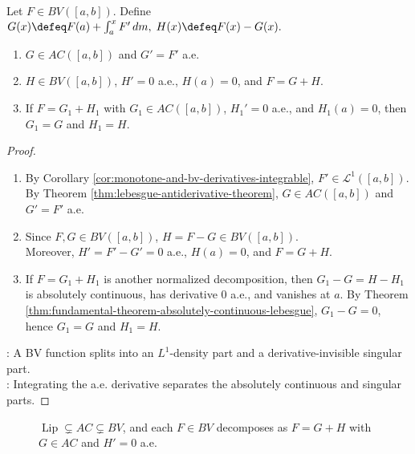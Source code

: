 \begin{theorem} \label{thm:lebesgue-decomposition-bv-functions} \\
Let $F\in BV([a,b])$. Define
$G(x)\defeq F(a)+\int_a^xF'\,dm, \; H(x)\defeq F(x)-G(x).$
\begin{enumerate}[label=(\roman*)]
\setlength{\itemsep}{0pt}
\item $G\in AC([a,b])$ and $G'=F'$ a.e.
\item $H\in BV([a,b])$, $H'=0$ a.e., $H(a)=0$, and $F=G+H$.
\item If $F=G_1+H_1$ with $G_1\in AC([a,b])$, $H_1'=0$ a.e., and $H_1(a)=0$, then $G_1=G$ and $H_1=H$.
\end{enumerate}
\begin{proof}
\begin{enumerate}[label=(\roman*)]
\setlength{\itemsep}{0pt}
\item By Corollary \ref{cor:monotone-and-bv-derivatives-integrable}, $F'\in\mathscr{L}^1([a,b])$. By Theorem \ref{thm:lebesgue-antiderivative-theorem}, $G\in AC([a,b])$ and $G'=F'$ a.e.
\item Since $F,G\in BV([a,b])$, $H=F-G\in BV([a,b])$.\\
Moreover, $H'=F'-G'=0$ a.e., $H(a)=0$, and $F=G+H$.
\item If $F=G_1+H_1$ is another normalized decomposition, then $G_1-G=H-H_1$ is absolutely continuous, has derivative $0$ a.e., and vanishes at $a$. By Theorem \ref{thm:fundamental-theorem-absolutely-continuous-lebesgue}, $G_1-G=0$, hence $G_1=G$ and $H_1=H$.
\end{enumerate}
: A BV function splits into an $L^1$-density part and a derivative-invisible singular part.\\
: Integrating the a.e. derivative separates the absolutely continuous and singular parts.
\end{proof}
\end{theorem}

\begin{figure}[H]
  \centering
  
  \caption{$\operatorname{Lip}\subsetneq AC\subsetneq BV$, and each $F\in BV$ decomposes as $F=G+H$ with $G\in AC$ and $H'=0$ a.e.}
  \label{fig:ac-bv-hierarchy-decomposition}
\end{figure}

